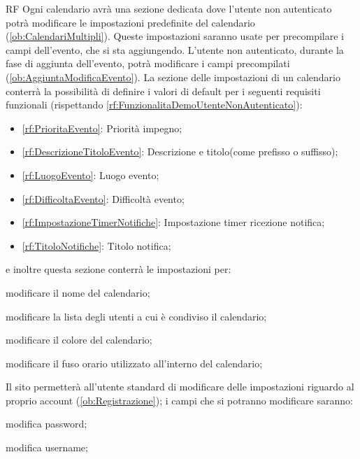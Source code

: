 \begin{listaPersonale}{RF}
	 Ogni calendario avrà una sezione dedicata dove l'utente non autenticato potrà modificare le impostazioni predefinite del calendario (\ref{ob:CalendariMultipli}). Queste impostazioni saranno usate per precompilare i campi dell'evento, che si sta aggiungendo. L'utente non autenticato, durante la fase di aggiunta dell'evento, potrà modificare i campi precompilati (\ref{ob:AggiuntaModificaEvento}). La sezione delle impostazioni di un calendario conterrà la possibilità di definire i valori di default per i seguenti requisiti funzionali (rispettando \ref{rf:FunzionalitaDemoUtenteNonAutenticato}):
	\begin{itemize}
		\item \ref{rf:PrioritaEvento}: Priorità impegno;
		\item \ref{rf:DescrizioneTitoloEvento}: Descrizione e titolo(come prefisso o suffisso);
		\item \ref{rf:LuogoEvento}: Luogo evento;
		\item \ref{rf:DifficoltaEvento}: Difficoltà evento;
		\item \ref{rf:ImpostazioneTimerNotifiche}: Impostazione timer ricezione notifica;
		\item \ref{rf:TitoloNotifiche}: Titolo notifica;
	\end{itemize}
	e inoltre questa sezione conterrà le impostazioni per:
	\begin{listaPersonale2}[RF]{}
		 modificare il nome del calendario;

		 modificare la lista degli utenti a cui è condiviso il calendario;

		 modificare il colore del calendario;

		 modificare il fuso orario utilizzato all'interno del calendario;
	\end{listaPersonale2}

	 Il sito permetterà all'utente standard di modificare delle impostazioni riguardo al proprio account (\ref{ob:Registrazione}); i campi che si potranno modificare saranno:
	\begin{listaPersonale2}[RF]{}
		 modifica password;

		 modifica username;


\end{listaPersonale2}
\end{listaPersonale}
